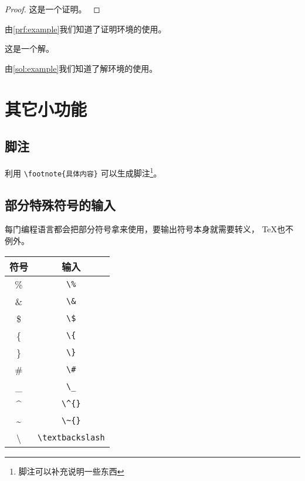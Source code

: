 \documentclass[withoutpreface,bwprint]{cumcmthesis} %
\numberwithin{equation}{subsection}
\begin{document}
\begin{proof}
    这是一个证明。
    \label{prf:example}
\end{proof}
由\cref{prf:example}我们知道了证明环境的使用。

\begin{solution}
    这是一个解。
    \label{sol:example}
\end{solution}
由\cref{sol:example}我们知道了解环境的使用。



\section{其它小功能}
\subsection{脚注}

利用 \verb|\footnote{具体内容}| 可以生成脚注\footnote{脚注可以补充说明一些东西}。

\subsection{部分特殊符号的输入}

每门编程语言都会把部分符号拿来使用，要输出符号本身就需要转义， \TeX{}也不例外。

\begin{table}[!ht]
	\centering
	\begin{tabular}{cc}
		\toprule
		符号            &  输入                   \\
		\midrule
		\%              &  \verb|\%|             \\
		\&              &  \verb|\&|             \\
		\$              &  \verb|\$|             \\
		\{              &  \verb|\{|             \\
		\}              &  \verb|\}|             \\
		\#              &  \verb|\#|             \\
		\_              &  \verb|\_|             \\
		\^{}            &  \verb|\^{}|           \\
		\~{}            &  \verb|\~{}|           \\
		\textbackslash  &  \verb|\textbackslash| \\
		\bottomrule
	\end{tabular}
\end{table}
\end{document}

